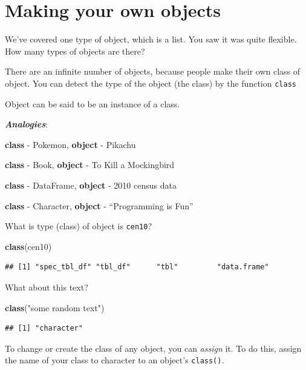 \documentclass[
]{book}
\newenvironment{Shaded}{\begin{snugshade}}{\end{snugshade}}
\newcommand{\KeywordTok}[1]{\textcolor[rgb]{0.13,0.29,0.53}{\textbf{#1}}}
\newcommand{\NormalTok}[1]{#1}
\newcommand{\StringTok}[1]{\textcolor[rgb]{0.31,0.60,0.02}{#1}}
\theoremstyle{definition}
\theoremstyle{definition}
\theoremstyle{definition}
\theoremstyle{definition}
\theoremstyle{remark}
\begin{document}
\hypertarget{making-your-own-objects}{%
\section{Making your own objects}\label{making-your-own-objects}}

We've covered one type of object, which is a list. You saw it was quite flexible. How many types of objects are there?

There are an infinite number of objects, because people make their own class of object. You can detect the type of the object (the class) by the function \texttt{class}

Object can be said to be an instance of a class.

\textbf{\emph{Analogies}}:

\textbf{class} - Pokemon, \textbf{object} - Pikachu

\textbf{class} - Book, \textbf{object} - To Kill a Mockingbird

\textbf{class} - DataFrame, \textbf{object} - 2010 census data

\textbf{class} - Character, \textbf{object} - ``Programming is Fun''

What is type (class) of object is \texttt{cen10}?

\begin{Shaded}
\begin{Highlighting}[]
\KeywordTok{class}\NormalTok{(cen10)}
\end{Highlighting}
\end{Shaded}

\begin{verbatim}
## [1] "spec_tbl_df" "tbl_df"      "tbl"         "data.frame"
\end{verbatim}

What about this text?

\begin{Shaded}
\begin{Highlighting}[]
\KeywordTok{class}\NormalTok{(}\StringTok{"some random text"}\NormalTok{)}
\end{Highlighting}
\end{Shaded}

\begin{verbatim}
## [1] "character"
\end{verbatim}

To change or create the class of any object, you can \emph{assign} it. To do this, assign the name of your class to character to an object's \texttt{class()}.
\end{document}

